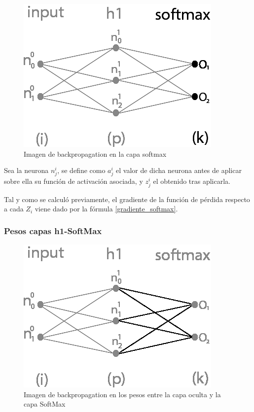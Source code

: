 \begin{figure}[H]
	\centering
	\includegraphics[scale=0.35]{imagenes/nn_1_capa_output.jpg}  
	\caption{Imagen de backpropagation en la capa softmax}
	\label{fig:nn_1_capa_output}
\end{figure}

Sea la neurona $n^i_j$, se define como $a^i_j$ el valor de dicha neurona antes de aplicar sobre ella su función de activación asociada, y $z^i_j$ el obtenido tras aplicarla. 

Tal y como se calculó previamente, el gradiente de la función de pérdida respecto a cada $Z_i$ viene dado por la fórmula \ref{gradiente_softmax}.


\subsubsection{Pesos capas h1-SoftMax}

\begin{figure}[H]
	\centering
	\includegraphics[scale=0.35]{imagenes/nn_1_capa_pesos_h1_output.jpg}  
	\caption{Imagen de backpropagation en los pesos entre la capa oculta y la capa SoftMax}
	\label{fig:nn_1_pesos_h1_output}
\end{figure}

